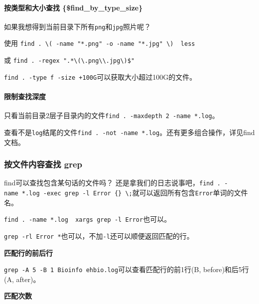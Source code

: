 \documentclass[]{article}
\numberwithin{figure}{section}
\numberwithin{table}{section}
\begin{document}
\hypertarget{ux6309ux7c7bux578bux548cux5927ux5c0fux67e5ux627e-find_by_type_size}{%
\paragraph{按类型和大小查找 \{\$find\_by\_type\_size\}}\label{ux6309ux7c7bux578bux548cux5927ux5c0fux67e5ux627e-find_by_type_size}}

如果我想得到当前目录下所有\texttt{png}和\texttt{jpg}照片呢？

使用 \texttt{find\ .\ \textbackslash{}(\ -name\ "*.png"\ -o\ -name\ "*.jpg"\ \textbackslash{})\ \textbar{}\ less}

或 \texttt{find\ .\ -regex\ ".*\textbackslash{}(\textbackslash{}.png\textbackslash{}\textbar{}\textbackslash{}.jpg\textbackslash{})\$"}

\texttt{find\ .\ -type\ f\ -size\ +100G}可以获取大小超过100G的文件。

\hypertarget{find_maxdepth}{%
\paragraph{限制查找深度}\label{find_maxdepth}}

只看当前目录2层子目录内的文件\texttt{find\ .\ -maxdepth\ 2\ -name\ *.log}。

查看不是\texttt{log}结尾的文件\texttt{find\ .\ -not\ -name\ *.log}。还有更多组合操作，详见find文档。

\hypertarget{grep_file}{%
\subsubsection{按文件内容查找 grep}\label{grep_file}}

find可以查找包含某句话的文件吗？ 还是拿我们的日志说事吧，\texttt{find\ .\ -name\ *.log\ -exec\ grep\ -l\ \textquotesingle{}Error\textquotesingle{}\ \{\}\ \textbackslash{};}就可以返回所有包含\texttt{Error}单词的文件名。

\texttt{find\ .\ -name\ *.log\ \textbar{}\ xargs\ grep\ -l\ \textquotesingle{}Error\textquotesingle{}}也可以。

\texttt{grep\ -rl\ \textquotesingle{}Error\textquotesingle{}\ *}也可以，不加\texttt{-l}还可以顺便返回匹配的行。

\textbf{匹配行的前后行}

\texttt{grep\ -A\ 5\ -B\ 1\ \textquotesingle{}Bioinfo\textquotesingle{}\ ehbio.log}可以查看匹配行的前1行(B, before)和后5行(A, after)。

\textbf{匹配次数}
\end{document}
